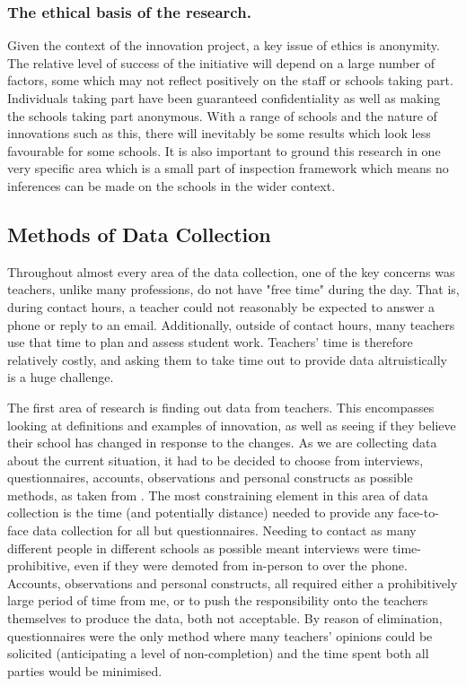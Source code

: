 \subsubsection{The ethical basis of the research.}
Given the context of the innovation project, a key issue of ethics is anonymity. The relative level of success of the initiative will depend on a large number of factors, some which may not reflect positively on the staff or schools taking part. Individuals taking part have been guaranteed confidentiality as well as making the schools taking part anonymous. With a range of schools and the nature of innovations such as this, there will inevitably be some results which look less favourable for some schools. It is also important to ground this research in one very specific area which is a small part of inspection framework which means no inferences can be made on the schools in the wider context.

\subsection{Methods of Data Collection}
Throughout almost every area of the data collection, one of the key concerns was teachers, unlike many professions, do not have "free time" during the day. That is, during contact hours, a teacher could not reasonably be expected to answer a phone or reply to an email. Additionally, outside of contact hours, many teachers use that time to plan and assess student work. Teachers' time is therefore relatively costly, and asking them to take time out to provide data altruistically is a huge challenge.

The first area of research is finding out data from teachers. This encompasses looking at definitions and examples of innovation, as well as seeing if they believe their school has changed in response to the changes. As we are collecting data about the current situation, it had to be decided to choose from interviews, questionnaires, accounts, observations and personal constructs as possible methods, as taken from \citet{Cohen2005}.
The most constraining element in this area of data collection is the time (and potentially distance) needed to provide any face-to-face data collection for all but questionnaires. Needing to contact as many different people in different schools as possible meant interviews were time-prohibitive, even if they were demoted from in-person to over the phone. Accounts, observations and personal constructs, all required either a prohibitively large period of time from me, or to push the responsibility onto the teachers themselves to produce the data, both not acceptable. By reason of elimination, questionnaires were the only method where many teachers' opinions could be solicited (anticipating a level of non-completion) and the time spent both all parties would be minimised.


